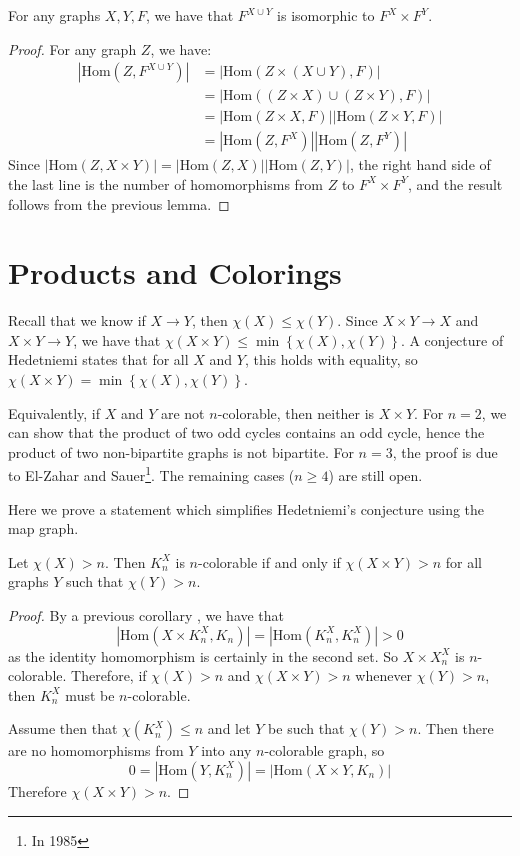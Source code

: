 \begin{lemma}
	For any graphs $X,Y,F$, we have that $F^{X\cup Y}$ is isomorphic to $F^X\times F^Y$.
\end{lemma}

\begin{proof}
	For any graph $Z$, we have:
	\begin{align*}
	|\mathrm{Hom}(Z,F^{X\cup Y})|&=|\mathrm{Hom}(Z\times(X\cup Y),F)|\\
	                    &=|\mathrm{Hom}((Z\times X)\cup (Z\times Y),F)|\\
	                    &=|\mathrm{Hom}(Z\times X,F)||\mathrm{Hom}(Z\times Y,F)|\\
	                    &=|\mathrm{Hom}(Z,F^X)||\mathrm{Hom}(Z,F^Y)|
	\end{align*}
	Since $|\mathrm{Hom}(Z,X\times Y)|=|\mathrm{Hom}(Z,X)||\mathrm{Hom}(Z,Y)|$, the right hand side of the last line is the number of homomorphisms from $Z$ to $F^X\times F^Y$, and the result follows from the previous lemma.
\end{proof}

\section*{Products and Colorings}

Recall that we know if $X\rightarrow Y$, then $\chi(X)\leq \chi(Y)$.  Since $X\times Y\rightarrow X$ and $X\times Y\rightarrow Y$, we have that $\chi(X\times Y)\leq\min\left\{\chi(X),\chi(Y)\right\}$.  A conjecture of Hedetniemi states that for all $X$ and $Y$, this holds with equality, so $\chi(X\times Y)=\min\left\{\chi(X),\chi(Y)\right\}$.  

Equivalently, if $X$ and $Y$ are not $n$-colorable, then neither is $X\times Y$.  For $n=2$, we can show that the product of two odd cycles contains an odd cycle, hence the product of two non-bipartite graphs is not bipartite.  For $n=3$, the proof is due to El-Zahar and Sauer\footnote{In 1985}.  The remaining cases ($n\geq 4$) are still open.

Here we prove a statement which simplifies Hedetniemi's conjecture using the map graph.

\begin{theorem}
	Let $\chi(X)>n$.  Then $K_n^X$ is $n$-colorable if and only if $\chi(X\times Y)>n$ for all graphs $Y$ such that $\chi(Y)>n$.
\end{theorem}
\begin{proof}
	{By a previous corollary , we have that $$|\mathrm{Hom}(X\times K_n^X,K_n)|=|\mathrm{Hom}(K_n^X,K_n^X)|>0$$ as the identity homomorphism is certainly in the second set. So $X\times X_n^X$ is $n$-colorable.  Therefore, if $\chi(X)>n$ and $\chi(X\times Y)>n$ whenever $\chi(Y)>n$, then $K_n^X$ must be $n$-colorable.
	
Assume then that $\chi(K_n^X)\leq n$ and let $Y$ be such that $\chi(Y)>n$.  Then there are no homomorphisms from $Y$ into any $n$-colorable graph, so $$0=|\mathrm{Hom}(Y,K_n^X)|=|\mathrm{Hom}(X\times Y,K_n)|$$ Therefore $\chi(X\times Y)>n$. }
\end{proof}


